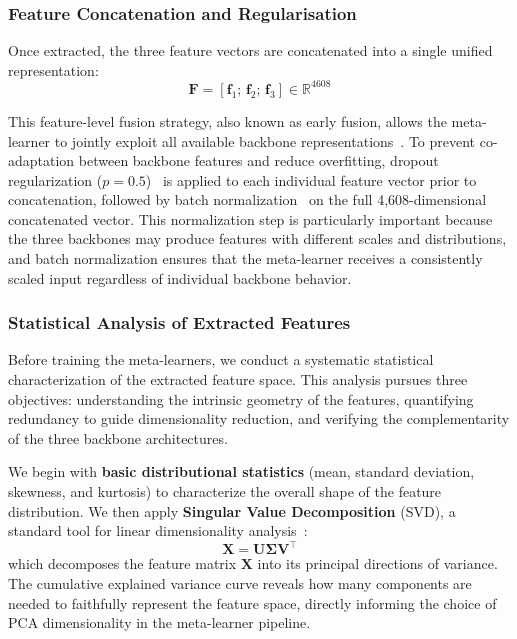 \documentclass[pdflatex,sn-basic]{sn-jnl}
\begin{document}
\subsubsection{Feature Concatenation and Regularisation}

Once extracted, the three feature vectors are concatenated into a single unified representation:
\begin{equation}
    \mathbf{F} = [\mathbf{f}_1;\, \mathbf{f}_2;\, \mathbf{f}_3] \in \mathbb{R}^{4608}
    \label{eq:concatenation}
\end{equation}

This feature-level fusion strategy, also known as early fusion, allows the meta-learner to jointly exploit all available backbone representations~\cite{ramachandram2017deep}. To prevent co-adaptation between backbone features and reduce overfitting, dropout regularization ($p = 0.5$)~\cite{srivastava2014dropout} is applied to each individual feature vector prior to concatenation, followed by batch normalization~\cite{ioffe2015batch} on the full 4,608-dimensional concatenated vector. This normalization step is particularly important because the three backbones may produce features with different scales and distributions, and batch normalization ensures that the meta-learner receives a consistently scaled input regardless of individual backbone behavior.

\subsubsection{Statistical Analysis of Extracted Features}
\label{subsec:feature_statistics}

Before training the meta-learners, we conduct a systematic statistical characterization of the extracted feature space. This analysis pursues three objectives: understanding the intrinsic geometry of the features, quantifying redundancy to guide dimensionality reduction, and verifying the complementarity of the three backbone architectures.

We begin with \textbf{basic distributional statistics} (mean, standard deviation, skewness, and kurtosis) to characterize the overall shape of the feature distribution. We then apply \textbf{Singular Value Decomposition} (SVD), a standard tool for linear dimensionality analysis~\cite{golub1965calculating}:
\begin{equation}
    \mathbf{X} = \mathbf{U}\boldsymbol{\Sigma}\mathbf{V}^{\top}
    \label{eq:svd}
\end{equation}
which decomposes the feature matrix $\mathbf{X}$ into its principal directions of variance. The cumulative explained variance curve reveals how many components are needed to faithfully represent the feature space, directly informing the choice of PCA dimensionality in the meta-learner pipeline.
\end{document}
